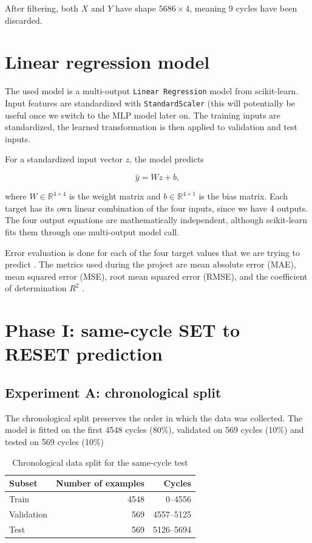 \documentclass[11pt,a4paper]{article}
\begin{document}
After filtering, both $X$ and $Y$ have shape $5686\times4$, meaning 9 cycles have been discarded.

\section{Linear regression model}

The used model is a multi-output \texttt{Linear Regression} model from
scikit-learn. Input features are standardized with \texttt{StandardScaler} (this will potentially be useful once we switch to the MLP model later on.
The training inputs are standardized, the learned transformation is
then applied to validation and test inputs.

For a standardized input vector $z$, the model predicts

\[
\hat{y}=Wz+b,
\]

where $W\in\mathbb{R}^{4\times4}$ is the weight matrix and $b\in\mathbb{R}^{4\times1}$ is the bias matrix. Each target has
its own linear combination of the four inputs, since we have 4 outputs. The four output equations are
mathematically independent, although scikit-learn fits them through one
multi-output model call.

Error evaluation is done for each of the four target values that we are trying to predict . The metrics used during the project are mean absolute error (MAE), mean squared error (MSE), root mean
squared error (RMSE), and the coefficient of determination $R^2$ .

\section{Phase I: same-cycle SET to RESET prediction}

\subsection{Experiment A: chronological split}

The chronological split preserves the order in which the data was collected. The model is fitted on
the first 4548 cycles (80\%), validated on 569 cycles (10\%)  and tested on 569 cycles (10\%)

\begin{table}[H]
\centering
\caption{Chronological data split for the same-cycle test}
\begin{tabular}{lrr}
\toprule
Subset & Number of examples & Cycles \\
\midrule
Train & 4548 & 0--4556 \\
Validation & 569 & 4557--5125 \\
Test & 569 & 5126--5694 \\
\bottomrule
\end{tabular}
\end{table}
\end{document}

